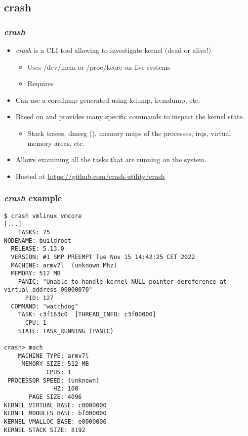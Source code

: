 \subsection{crash}

\begin{frame}
  \frametitle{{\em crash}}
  \begin{itemize}
    \item {\em crash} is a CLI tool allowing to investigate kernel (dead or
      alive!)
    \begin{itemize}
      \item Uses /dev/mem or /proc/kcore on live systems
      \item Requires 
    \end{itemize}
    \item Can use a coredump generated using kdump, kvmdump, etc.
    \item Based on  and provides many specific commands to inspect the
      kernel state.
    \begin{itemize}
      \item Stack traces, dmesg (), memory maps of the processes,
            irqs, virtual memory areas, etc.
    \end{itemize}
    \item Allows examining all the tasks that are running on the system.
    \item Hosted at \url{https://github.com/crash-utility/crash}
  \end{itemize}
\end{frame}

\begin{frame}[fragile]
  \frametitle{{\em crash} example}
  \begin{itemize}
    \begin{block}{}
      \begin{verbatim}
$ crash vmlinux vmcore
[...]
    TASKS: 75
NODENAME: buildroot
  RELEASE: 5.13.0
  VERSION: #1 SMP PREEMPT Tue Nov 15 14:42:25 CET 2022
  MACHINE: armv7l  (unknown Mhz)
  MEMORY: 512 MB
    PANIC: "Unable to handle kernel NULL pointer dereference at virtual address 00000070"
      PID: 127
  COMMAND: "watchdog"
    TASK: c3f163c0  [THREAD_INFO: c3f00000]
      CPU: 1
    STATE: TASK_RUNNING (PANIC)

crash> mach
    MACHINE TYPE: armv7l
     MEMORY SIZE: 512 MB
            CPUS: 1
 PROCESSOR SPEED: (unknown)
              HZ: 100
       PAGE SIZE: 4096
KERNEL VIRTUAL BASE: c0000000
KERNEL MODULES BASE: bf000000
KERNEL VMALLOC BASE: e0000000
KERNEL STACK SIZE: 8192
      \end{verbatim}
    \end{block}
  \end{itemize}
\end{frame}

